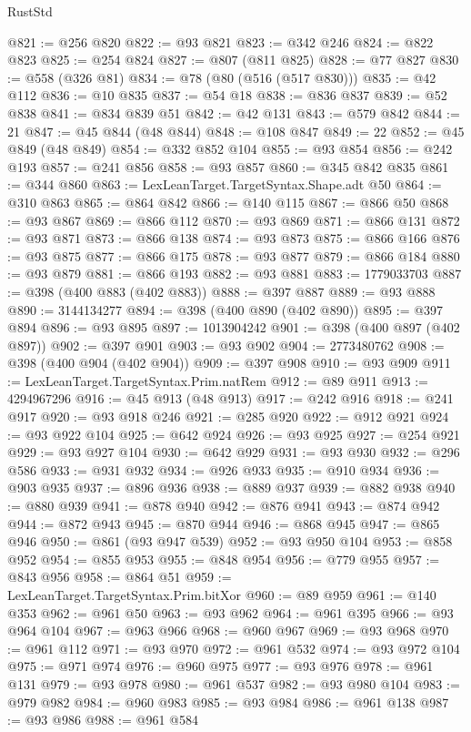 \begin{lexlean}{RustStd}
\begin{coremodule}
@821 := @256 @820
@822 := @93 @821
@823 := @342 @246
@824 := @822 @823
@825 := @254 @824
@827 := @807 (@811 @825)
@828 := @77 @827
@830 := @558 (@326 @81)
@834 := @78 (@80 (@516 (@517 @830)))
@835 := @42 @112
@836 := @10 @835
@837 := @54 @18
@838 := @836 @837
@839 := @52 @838
@841 := @834 @839 @51
@842 := @42 @131
@843 := @579 @842
@844 := 21
@847 := @45 @844 (@48 @844)
@848 := @108 @847
@849 := 22
@852 := @45 @849 (@48 @849)
@854 := @332 @852 @104
@855 := @93 @854
@856 := @242 @193
@857 := @241 @856
@858 := @93 @857
@860 := @345 @842 @835
@861 := @344 @860
@863 := LexLeanTarget.TargetSyntax.Shape.adt @50
@864 := @310 @863
@865 := @864 @842
@866 := @140 @115
@867 := @866 @50
@868 := @93 @867
@869 := @866 @112
@870 := @93 @869
@871 := @866 @131
@872 := @93 @871
@873 := @866 @138
@874 := @93 @873
@875 := @866 @166
@876 := @93 @875
@877 := @866 @175
@878 := @93 @877
@879 := @866 @184
@880 := @93 @879
@881 := @866 @193
@882 := @93 @881
@883 := 1779033703
@887 := @398 (@400 @883 (@402 @883))
@888 := @397 @887
@889 := @93 @888
@890 := 3144134277
@894 := @398 (@400 @890 (@402 @890))
@895 := @397 @894
@896 := @93 @895
@897 := 1013904242
@901 := @398 (@400 @897 (@402 @897))
@902 := @397 @901
@903 := @93 @902
@904 := 2773480762
@908 := @398 (@400 @904 (@402 @904))
@909 := @397 @908
@910 := @93 @909
@911 := LexLeanTarget.TargetSyntax.Prim.natRem
@912 := @89 @911
@913 := 4294967296
@916 := @45 @913 (@48 @913)
@917 := @242 @916
@918 := @241 @917
@920 := @93 @918 @246
@921 := @285 @920
@922 := @912 @921
@924 := @93 @922 @104
@925 := @642 @924
@926 := @93 @925
@927 := @254 @921
@929 := @93 @927 @104
@930 := @642 @929
@931 := @93 @930
@932 := @296 @586
@933 := @931 @932
@934 := @926 @933
@935 := @910 @934
@936 := @903 @935
@937 := @896 @936
@938 := @889 @937
@939 := @882 @938
@940 := @880 @939
@941 := @878 @940
@942 := @876 @941
@943 := @874 @942
@944 := @872 @943
@945 := @870 @944
@946 := @868 @945
@947 := @865 @946
@950 := @861 (@93 @947 @539)
@952 := @93 @950 @104
@953 := @858 @952
@954 := @855 @953
@955 := @848 @954
@956 := @779 @955
@957 := @843 @956
@958 := @864 @51
@959 := LexLeanTarget.TargetSyntax.Prim.bitXor
@960 := @89 @959
@961 := @140 @353
@962 := @961 @50
@963 := @93 @962
@964 := @961 @395
@966 := @93 @964 @104
@967 := @963 @966
@968 := @960 @967
@969 := @93 @968
@970 := @961 @112
@971 := @93 @970
@972 := @961 @532
@974 := @93 @972 @104
@975 := @971 @974
@976 := @960 @975
@977 := @93 @976
@978 := @961 @131
@979 := @93 @978
@980 := @961 @537
@982 := @93 @980 @104
@983 := @979 @982
@984 := @960 @983
@985 := @93 @984
@986 := @961 @138
@987 := @93 @986
@988 := @961 @584

\end{coremodule}
\end{lexlean}
